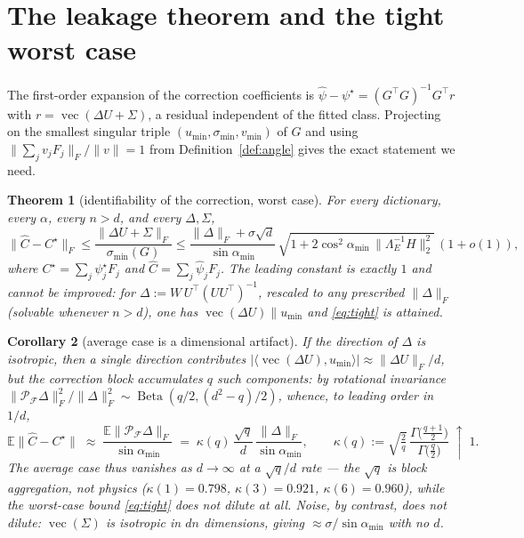 \documentclass[11pt]{article}
\newtheorem{theorem}{Theorem}[section]
\newtheorem{corollary}[theorem]{Corollary}
\theoremstyle{remark}
\newcommand{\Le}{\Lambda_E}
\newcommand{\Cnorm}{\bigl\|\Le^{-1}H\bigr\|_2^2}
\begin{document}
\section{The leakage theorem and the tight worst case}\label{sec:leakage}

The first-order expansion of the correction coefficients is
$\hat\psi-\psi^\star=(G^{\top}G)^{-1}G^{\top}r$ with
$r=\operatorname{vec}(\Delta U+\Sigma)$, a residual independent of the fitted class.
Projecting on the smallest singular triple $(u_{\min},\sigma_{\min},v_{\min})$ of $G$ and
using $\|\sum_jv_jF_j\|_F/\|v\|=1$ from Definition~\ref{def:angle} gives the exact
statement we need.

\begin{theorem}[identifiability of the correction, worst case]\label{thm:tight}
For every dictionary, every $\alpha$, every $n>d$, and every $\Delta,\Sigma$,
\begin{equation}\label{eq:tight}
  \|\hat C-C^\star\|_F\le
  \frac{\|\Delta U+\Sigma\|_F}{\sigma_{\min}(G)}
  \le\frac{\|\Delta\|_F+\sigma\sqrt d}{\sin\alpha_{\min}}\,
     \sqrt{1+2\cos^2\alpha_{\min}\,\Cnorm}\,(1+o(1)),
\end{equation}
where $C^\star=\sum_j\psi_j^\star F_j$ and $\hat C=\sum_j\hat\psi_jF_j$.
The leading constant is exactly $1$ and cannot be improved: for
$\Delta:=W\,U^{\top}(UU^{\top})^{-1}$, rescaled to any prescribed
$\|\Delta\|_F$ (solvable whenever $n>d$), one has $\operatorname{vec}(\Delta U)\parallel
u_{\min}$ and \eqref{eq:tight} is attained.
\end{theorem}

\begin{corollary}[average case is a dimensional artifact]\label{cor:dilution}
If the direction of $\Delta$ is isotropic, then a \emph{single} direction contributes
$|\langle\operatorname{vec}(\Delta U),u_{\min}\rangle|\approx\|\Delta U\|_F/d$, but the correction
\emph{block} accumulates $q$ such components: by rotational invariance
$\|\mathcal P_{\mathcal F}\Delta\|_F^{2}/\|\Delta\|_F^{2}\sim\operatorname{Beta}(q/2,(d^{2}-q)/2)$,
whence, to leading order in $1/d$,
\[
  \mathbb{E}\|\hat C-C^\star\|\;\approx\;
  \frac{\mathbb{E}\|\mathcal P_{\mathcal F}\Delta\|_F}{\sin\alpha_{\min}}
  \;=\;\kappa(q)\,\frac{\sqrt q}{d}\,\frac{\|\Delta\|_F}{\sin\alpha_{\min}},
  \qquad \kappa(q):=\sqrt{\tfrac2q}\,\frac{\Gamma\!\bigl(\frac{q+1}{2}\bigr)}{\Gamma\!\bigl(\frac q2\bigr)}\;\uparrow\;1 .
\]
The average case thus vanishes as $d\to\infty$ at a $\sqrt q/d$ rate --- the $\sqrt q$ is block
aggregation, not physics ($\kappa(1)=0.798$, $\kappa(3)=0.921$, $\kappa(6)=0.960$), while the
worst-case bound \eqref{eq:tight} does not dilute at all.
Noise, by contrast, does not dilute: $\operatorname{vec}(\Sigma)$ is isotropic in $dn$
dimensions, giving $\approx\sigma/\sin\alpha_{\min}$ with no $d$.
\end{corollary}
\end{document}
